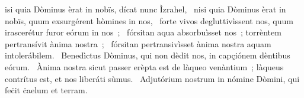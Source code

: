\psalmChapterWithInscription{}
{ }
{%
isi quia Dòminus èrat in nobïs, dícat nunc Ìzrahel, 
~nisi quia Dòminus èrat in nobïs, quum exsurgérent hòmines in nos, 
~forte vivos degluttivìssent nos, quum irascerétur furor eórum in nos~; 
~fórsitan aqua absorbuìsset nos~; torrèntem pertransívit ànima nostra~; 
~fórsitan pertransivìsset ànima nostra aquam intolerábilem. 
~Benedìctus Dòminus, qui non dèdit nos, in capçiónem dèntibus eórum. 
~Ànima nostra sicut passer erèpta est de làqueo venàntium~; làqueus contrítus est, et nos liberáti sùmus. 
~Adjutórium nostrum in nómine Dòmini, qui feċit ċaelum et terram. 
}
